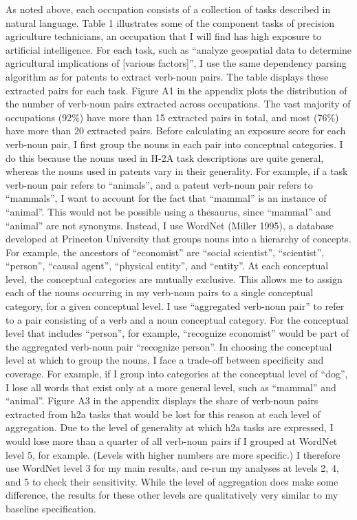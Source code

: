 \documentclass[11pt]{article}
\begin{document}
As noted above, each occupation consists of a collection of tasks described in natural
language. Table 1 illustrates some of the component tasks of precision agriculture technicians,
an occupation that I will find has high exposure to artificial intelligence. For each task, such as
“analyze geospatial data to determine agricultural implications of [various factors]”, I use the same
dependency parsing algorithm as for patents to extract verb-noun pairs. The table displays these
extracted pairs for each task. Figure A1 in the appendix plots the distribution of the number of
 verb-noun pairs extracted across occupations. The vast majority of occupations (92\%) have more
than 15 extracted pairs in total, and most (76\%) have more than 20 extracted pairs.
Before calculating an exposure score for each verb-noun pair, I first group the nouns in each
pair into conceptual categories. I do this because the nouns used in H-2A task descriptions are
quite general, whereas the nouns used in patents vary in their generality. For example, if a
task verb-noun pair refers to “animals”, and a patent verb-noun pair refers to “mammals”, I want
to account for the fact that “mammal” is an instance of “animal”. This would not be possible using
a thesaurus, since “mammal” and “animal” are not synonyms.
Instead, I use WordNet (Miller 1995), a database developed at Princeton University that groups
nouns into a hierarchy of concepts. For example, the ancestors of “economist” are “social scientist”,
“scientist”, “person”, “causal agent”, “physical entity”, and “entity”. At each conceptual level, the
conceptual categories are mutually exclusive. This allows me to assign each of the nouns occurring
in my verb-noun pairs to a single conceptual category, for a given conceptual level. I use “aggregated
verb-noun pair” to refer to a pair consisting of a verb and a noun conceptual category. For the
conceptual level that includes “person”, for example, “recognize economist” would be part of the
aggregated verb-noun pair “recognize person”.
In choosing the conceptual level at which to group the nouns, I face a trade-off between specificity
and coverage. For example, if I group into categories at the conceptual level of “dog”, I lose all
words that exist only at a more general level, such as “mammal” and “animal”. Figure A3 in the
appendix displays the share of verb-noun pairs extracted from h2a tasks that would be lost for
this reason at each level of aggregation. Due to the level of generality at which h2a tasks are
expressed, I would lose more than a quarter of all verb-noun pairs if I grouped at WordNet level 5,
for example. (Levels with higher numbers are more specific.) I therefore use WordNet level 3 for
my main results, and re-run my analyses at levels 2, 4, and 5 to check their sensitivity. While the
level of aggregation does make some difference, the results for these other levels are qualitatively
very similar to my baseline specification.
\end{document}
